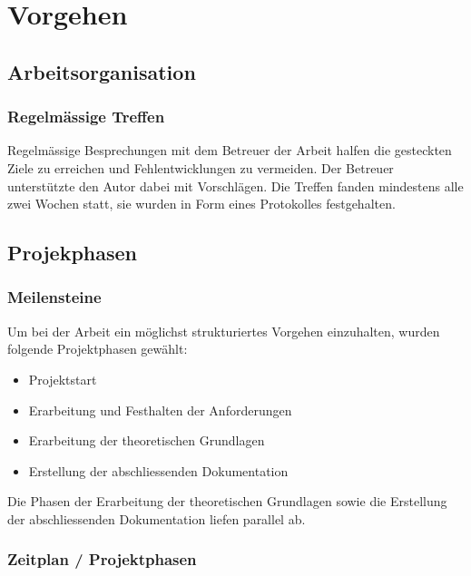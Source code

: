 
\chapter{Vorgehen}
\label{chap:procedure}

\section{Arbeitsorganisation}
\label{sec:organization}

\subsection{Regelmässige Treffen}
\label{subsec:meetings}

Regelmässige Besprechungen mit dem Betreuer der Arbeit halfen die gesteckten Ziele zu erreichen und Fehlentwicklungen zu vermeiden. Der Betreuer unterstützte den Autor dabei mit Vorschlägen. Die Treffen fanden mindestens alle zwei Wochen statt, sie wurden in Form eines Protokolles festgehalten.

\section{Projekphasen}
\label{sec:project_schedule}

\subsection{Meilensteine}
\label{subsec:milestones}

Um bei der Arbeit ein möglichst strukturiertes Vorgehen einzuhalten, wurden folgende Projektphasen gewählt:
\begin{itemize}
    \item Projektstart
    \item Erarbeitung und Festhalten der Anforderungen
    \item Erarbeitung der theoretischen Grundlagen
    \item Erstellung der abschliessenden Dokumentation
\end{itemize}

Die Phasen der Erarbeitung der theoretischen Grundlagen sowie die Erstellung der abschliessenden Dokumentation liefen parallel ab.

\subsection{Zeitplan / Projektphasen}
\label{subsec:timeschedule}

